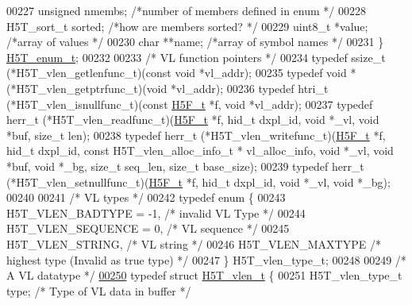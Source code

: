 \begin{DoxyCode}
00227     \textcolor{keywordtype}{unsigned}    nmembs;     \textcolor{comment}{/*number of members defined in enum  */}
00228     H5T\_sort\_t  sorted;     \textcolor{comment}{/*how are members sorted?        */}
00229     uint8\_t *value;     \textcolor{comment}{/*array of values            */}
00230     \textcolor{keywordtype}{char}    **name;     \textcolor{comment}{/*array of symbol names          */}
00231 \} \hyperlink{struct_h5_t__enum__t}{H5T\_enum\_t};
00232 
00233 \textcolor{comment}{/* VL function pointers */}
00234 \textcolor{keyword}{typedef} ssize\_t (*H5T\_vlen\_getlenfunc\_t)(\textcolor{keyword}{const} \textcolor{keywordtype}{void} *vl\_addr);
00235 \textcolor{keyword}{typedef} \textcolor{keywordtype}{void} * (*H5T\_vlen\_getptrfunc\_t)(\textcolor{keywordtype}{void} *vl\_addr);
00236 \textcolor{keyword}{typedef} htri\_t (*H5T\_vlen\_isnullfunc\_t)(\textcolor{keyword}{const} \hyperlink{struct_h5_f__t}{H5F\_t} *f, \textcolor{keywordtype}{void} *vl\_addr);
00237 \textcolor{keyword}{typedef} herr\_t (*H5T\_vlen\_readfunc\_t)(\hyperlink{struct_h5_f__t}{H5F\_t} *f, hid\_t dxpl\_id, \textcolor{keywordtype}{void} *\_vl, \textcolor{keywordtype}{void} *buf, \textcolor{keywordtype}{size\_t} len);
00238 \textcolor{keyword}{typedef} herr\_t (*H5T\_vlen\_writefunc\_t)(\hyperlink{struct_h5_f__t}{H5F\_t} *f, hid\_t dxpl\_id, \textcolor{keyword}{const} H5T\_vlen\_alloc\_info\_t *
      vl\_alloc\_info, \textcolor{keywordtype}{void} *\_vl, \textcolor{keywordtype}{void} *buf, \textcolor{keywordtype}{void} *\_bg, \textcolor{keywordtype}{size\_t} seq\_len, \textcolor{keywordtype}{size\_t} base\_size);
00239 \textcolor{keyword}{typedef} herr\_t (*H5T\_vlen\_setnullfunc\_t)(\hyperlink{struct_h5_f__t}{H5F\_t} *f, hid\_t dxpl\_id, \textcolor{keywordtype}{void} *\_vl, \textcolor{keywordtype}{void} *\_bg);
00240 
00241 \textcolor{comment}{/* VL types */}
00242 \textcolor{keyword}{typedef} \textcolor{keyword}{enum} \{
00243     H5T\_VLEN\_BADTYPE =  -1, \textcolor{comment}{/* invalid VL Type */}
00244     H5T\_VLEN\_SEQUENCE = 0,  \textcolor{comment}{/* VL sequence */}
00245     H5T\_VLEN\_STRING,        \textcolor{comment}{/* VL string */}
00246     H5T\_VLEN\_MAXTYPE        \textcolor{comment}{/* highest type (Invalid as true type) */}
00247 \} H5T\_vlen\_type\_t;
00248 
00249 \textcolor{comment}{/* A VL datatype */}
\hyperlink{struct_h5_t__vlen__t}{00250} \textcolor{keyword}{typedef} \textcolor{keyword}{struct }\hyperlink{struct_h5_t__vlen__t}{H5T\_vlen\_t} \{
00251     H5T\_vlen\_type\_t     type;   \textcolor{comment}{/* Type of VL data in buffer */}

\end{DoxyCode}
